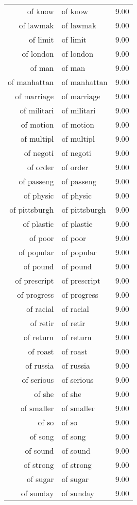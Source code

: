 \begin{table}[ht]
\begin{tabular}{rlr}
  of know & of know & 9.00 \\ 
  of lawmak & of lawmak & 9.00 \\ 
  of limit & of limit & 9.00 \\ 
  of london & of london & 9.00 \\ 
  of man & of man & 9.00 \\ 
  of manhattan & of manhattan & 9.00 \\ 
  of marriage & of marriage & 9.00 \\ 
  of militari & of militari & 9.00 \\ 
  of motion & of motion & 9.00 \\ 
  of multipl & of multipl & 9.00 \\ 
  of negoti & of negoti & 9.00 \\ 
  of order & of order & 9.00 \\ 
  of passeng & of passeng & 9.00 \\ 
  of physic & of physic & 9.00 \\ 
  of pittsburgh & of pittsburgh & 9.00 \\ 
  of plastic & of plastic & 9.00 \\ 
  of poor & of poor & 9.00 \\ 
  of popular & of popular & 9.00 \\ 
  of pound & of pound & 9.00 \\ 
  of prescript & of prescript & 9.00 \\ 
  of progress & of progress & 9.00 \\ 
  of racial & of racial & 9.00 \\ 
  of retir & of retir & 9.00 \\ 
  of return & of return & 9.00 \\ 
  of roast & of roast & 9.00 \\ 
  of russia & of russia & 9.00 \\ 
  of serious & of serious & 9.00 \\ 
  of she & of she & 9.00 \\ 
  of smaller & of smaller & 9.00 \\ 
  of so & of so & 9.00 \\ 
  of song & of song & 9.00 \\ 
  of sound & of sound & 9.00 \\ 
  of strong & of strong & 9.00 \\ 
  of sugar & of sugar & 9.00 \\ 
  of sunday & of sunday & 9.00 \\ 

\end{tabular}
\end{table}

